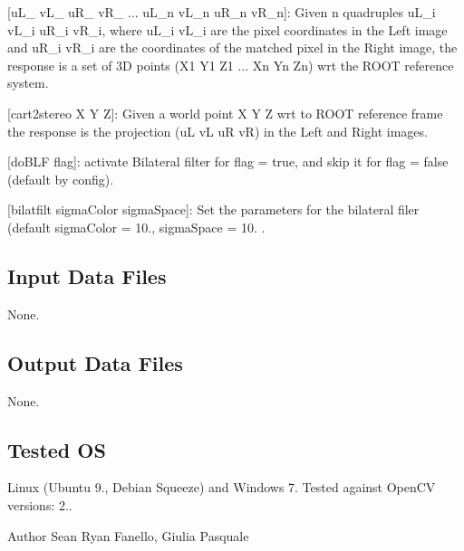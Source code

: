 \begin{DoxyItemize}
\begin{DoxyItemize}
\item \mbox{[}u\+L\+\_ v\+L\+\_ u\+R\+\_ v\+R\+\_ ... u\+L\+\_\+n v\+L\+\_\+n u\+R\+\_\+n v\+R\+\_\+n\mbox{]}\+: Given n quadruples u\+L\+\_\+i v\+L\+\_\+i u\+R\+\_\+i v\+R\+\_\+i, where u\+L\+\_\+i v\+L\+\_\+i are the pixel coordinates in the Left image and u\+R\+\_\+i v\+R\+\_\+i are the coordinates of the matched pixel in the Right image, the response is a set of 3D points (X1 Y1 Z1 ... Xn Yn Zn) wrt the R\+O\+OT reference system.
\item \mbox{[}cart2stereo X Y Z\mbox{]}\+: Given a world point X Y Z wrt to R\+O\+OT reference frame the response is the projection (uL vL uR vR) in the Left and Right images.
\item \mbox{[}do\+B\+LF flag\mbox{]}\+: activate Bilateral filter for flag = true, and skip it for flag = false (default by config).
\item \mbox{[}bilatfilt sigma\+Color sigma\+Space\mbox{]}\+: Set the parameters for the bilateral filer (default sigma\+Color = 10., sigma\+Space = 10. .
\end{DoxyItemize}
\end{DoxyItemize}\hypertarget{group__SFM_in_files_sec}{}\subsection{Input Data Files}\label{group__SFM_in_files_sec}
None.\hypertarget{group__SFM_out_data_sec}{}\subsection{Output Data Files}\label{group__SFM_out_data_sec}
None.\hypertarget{group__SFM_tested_os_sec}{}\subsection{Tested OS}\label{group__SFM_tested_os_sec}
Linux (Ubuntu 9., Debian Squeeze) and Windows 7. Tested against Open\+CV versions\+: 2..

\begin{DoxyAuthor}{Author}
Sean Ryan Fanello, Giulia Pasquale 
\end{DoxyAuthor}
